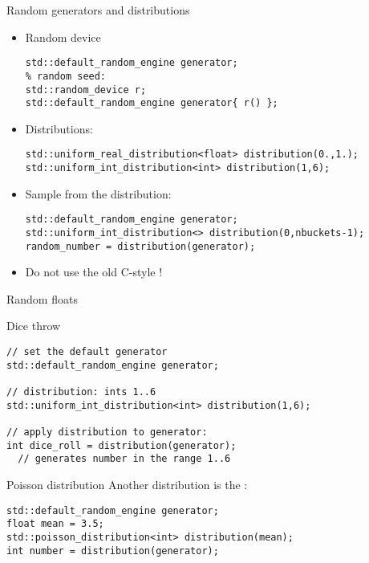 \begin{slide}{Random generators and distributions}
  \label{sl:std-rand-device}
  \begin{itemize}
  \item Random device
\begin{lstlisting}
std::default_random_engine generator;
% random seed:
std::random_device r;
std::default_random_engine generator{ r() };
\end{lstlisting}

\item Distributions:
\begin{lstlisting}
std::uniform_real_distribution<float> distribution(0.,1.);
std::uniform_int_distribution<int> distribution(1,6);
\end{lstlisting}

\item Sample from the distribution:
\begin{lstlisting}
std::default_random_engine generator;
std::uniform_int_distribution<> distribution(0,nbuckets-1);
random_number = distribution(generator);
\end{lstlisting}

  \item Do not use the old C-style !
  \end{itemize}
\end{slide}

\begin{block}{Random floats}
  \label{sl:stl:rand}
\end{block}

\begin{block}{Dice throw}
  \label{sl:stl:rand16}
\begin{lstlisting}
// set the default generator
std::default_random_engine generator;

// distribution: ints 1..6
std::uniform_int_distribution<int> distribution(1,6);

// apply distribution to generator:
int dice_roll = distribution(generator);
  // generates number in the range 1..6 
\end{lstlisting}
\end{block}

\begin{block}{Poisson distribution}
  \label{sl:st:poisson}
  Another distribution is the :
\begin{lstlisting}
std::default_random_engine generator;
float mean = 3.5;
std::poisson_distribution<int> distribution(mean);
int number = distribution(generator);
\end{lstlisting}
\end{block}

